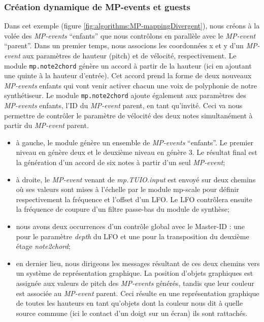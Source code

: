 \subsubsection{Création dynamique de MP-events et guests}

\noindent Dans cet exemple (figure \ref{fig:algorithms:MP-mappingDivergent}), nous créons à la volée des \textit{MP-events} ``enfants'' que nous contrôlons en parallèle avec le \textit{MP-event} ``parent''.
Dans un premier temps, nous associons les coordonnées x et y d'un \textit{MP-event} aux paramètres de hauteur (pitch) et de vélocité, respectivement. Le module \verb|mp.note2chord| génère un accord à partir de la hauteur (ici en ajoutant une quinte à la hauteur d'entrée). Cet accord prend la forme de deux nouveaux \textit{MP-events} enfants qui vont venir activer chacun une voix de polyphonie de notre synthétiseur. Le module \verb|mp.note2chord| ajoute également aux paramètres des \textit{MP-events} enfants, l'ID du \textit{MP-event} parent, en tant qu'invité. Ceci va nous permettre de contrôler le paramètre de vélocité des deux notes simultanément à partir du \textit{MP-event} parent. 

\vspace{-1em}
\begin{itemize}[noitemsep]
	\item à gauche, le module  génère un ensemble de \textit{MP-events} ``enfants''. Le premier niveau en génère deux et le deuxième niveau en génère 3. Le résultat final est la génération d'un accord de six notes à partir d'un seul \textit{MP-event};
	\item à droite, le \textit{MP-event} venant de \textit{mp.TUIO.input} est envoyé sur deux chemins où ses valeurs sont mises à l'échelle par le module mp-scale pour définir respectivement la fréquence et l'offset d'un \gls{LFO}. Le \gls{LFO} contrôlera ensuite la fréquence de coupure d'un filtre passe-bas du module de synthèse;
	\item nous avons deux occurrences d'un contrôle global avec le Master-ID : une pour le paramètre \textit{depth} du \gls{LFO} et une pour la transposition du deuxième étage \textit{note2chord};
	\item en dernier lieu, nous dirigeons les messages résultant de ces deux chemins vers un système de représentation graphique. La position d'objets graphiques est assignée aux valeurs de pitch des \textit{MP-events} générés, tandis que leur couleur est associée au \textit{MP-event} parent. Ceci résulte en une représentation graphique de toutes les hauteurs en tant qu'objets dont la couleur nous dit à quelle source commune (ici le contact d'un doigt sur un écran) ils sont rattachés.
\end{itemize}

